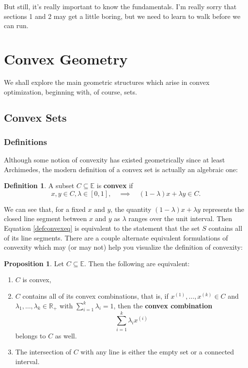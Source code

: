 \documentclass[11pt]{article}
\numberwithin{equation}{section}
\theoremstyle{definition}
\newtheorem{proposition}[theorem]{Proposition}
\newtheorem{definition}[theorem]{Definition}%
\newcommand{\bE}{\mathbb{E}}
\newcommand{\bR}{\mathbb{R}}
\newcommand{\AND}{\text{ and }}
\begin{document}
But still, it's really important to know the fundamentals. I'm really sorry that sections 1 and 2 may get a little boring, but we need to learn to walk before we can run.
\newpage
\section{Convex Geometry}
We shall explore the main geometric structures which arise in convex optimization, beginning with, of course, sets.
\subsection{Convex Sets}
\subsubsection{Definitions}
Although some notion of convexity has existed geometrically since at least Archimedes, the modern definition of a convex set is actually an algebraic one:
\begin{definition}
    \label{defconvex}%
    A subset $C\subseteq\bE$ is \textbf{convex} if
    \begin{equation} \label{defconvexeq}%
    x, y\in C, \lambda\in[0,1],\quad\implies\quad (1-\lambda)x+\lambda y\in C.\end{equation}
\end{definition}
We can see that, for a fixed $x\AND y$, the quantity $(1-\lambda)x+\lambda y$ represents the closed line segment between $x$ and $y$ as $\lambda$ ranges over the unit interval. Then Equation \ref{defconvexeq} is equivalent to the statement that the set $S$ contains all of its line segments. There are a couple alternate equivalent formulations of convexity which may (or may not) help you visualize the definition of convexity:
\begin{proposition}
    Let $C\subseteq\bE$. Then the following are equivalent:
    \begin{enumerate}[label=(\roman*)]
        \item $C$ is convex,
        \item $C$ contains all of its convex combinations, that is, if $x^{(1)}, \dots, x^{(k)}\in C$ and $\lambda_1, \dots, \lambda_k\in\bR_+$ with $\sum_{i=1}^k\lambda_i=1$, then the \textbf{convex combination}\footnotemark
        \begin{equation}\sum_{i=1}^k\lambda_ix^{(i)}\end{equation} belongs to $C$ as well.
        \item The intersection of $C$ with any line is either the empty set or a connected interval.
        \end{enumerate}
\end{proposition}
\end{document}
